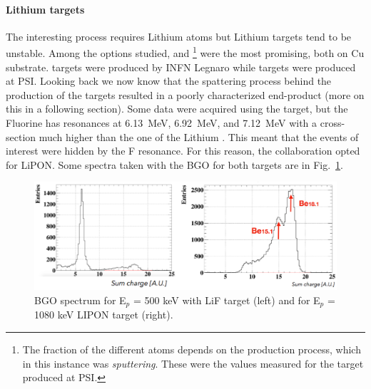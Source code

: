 \begin{refsection}
        \paragraph{Lithium targets}
        The interesting process requires Lithium atoms but Lithium targets tend to be unstable. 
        Among the options studied,  and \footnote{The fraction of the different atoms depends on the production process, which in this instance was \textit{sputtering}. These were the values measured for the target produced at PSI.} were the most promising, both on Cu substrate.
         targets were produced by INFN Legnaro while  targets were produced at PSI.
        Looking back we now know that the spattering process behind the production of the  targets resulted in a poorly characterized end-product (more on this in a following section). 
        Some data were acquired using the  target, but the Fluorine has resonances  at \SI{6.13}{MeV}, \SI{6.92}{MeV}, and \SI{7.12}{MeV} with a cross-section much higher than the one of the Lithium \cite{}.
        This meant that the events of interest were hidden by the F resonance.
        For this reason, the collaboration opted for LiPON.
        Some spectra taken with the BGO for both targets are in Fig.~\ref{fig:X17:BGO:targets}.

        \begin{figure}
            \centering
            \includegraphics[width=0.9\linewidth]{Figures//X17//X17_Feb2023/X17_BGO_targets.pdf}
            \caption[X17:BGO LiF and LIPON]{BGO spectrum for E$_p$ = 500 keV with LiF target (left) and  for E$_p$ = 1080 keV LIPON target (right).}
            \label{fig:X17:BGO:targets}
            \end{figure}
            

\end{refsection}
